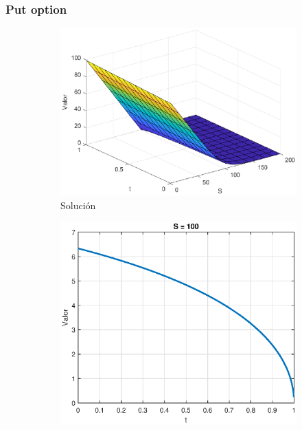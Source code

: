 \subsubsection{Put option}
\begin{figure}[H]
    \centering
    \begin{subfigure}[b]{0.35\linewidth}
        \includegraphics[width=\linewidth]{Imagenes/Parte1/6_Sols/Put/Put3D.eps}
        \caption{Solución}
    \end{subfigure}
    \begin{subfigure}[b]{0.35\linewidth}
        \includegraphics[width=\linewidth]{Imagenes/Parte1/6_Sols/Put/PutSFijo.eps}

\end{subfigure}
\end{figure}

